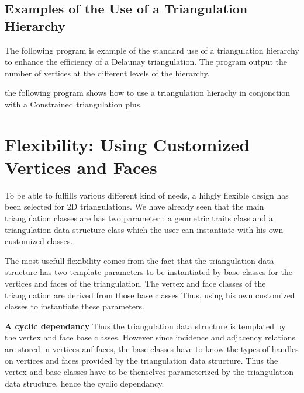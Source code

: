 \subsection{Examples of the Use of a  Triangulation Hierarchy}
\label{Subsection_2D_Triangulations_Basic_Example}

The following program is example
of the  standard use of a  triangulation hierarchy
to enhance the efficiency
of a Delaunay triangulation. The program output the number of vertices
at the different levels of the hierarchy.

the following program shows how to use
a triangulation hierachy in conjonction with a Constrained 
triangulation plus.

\section{Flexibility: Using  Customized Vertices and Faces}
\label{Section_2D_Triangulations_Flexibility}


To be able to fulfills various different kind of needs, a hihgly
flexible design has been  selected for 2D triangulations.
We have already seen that
the main triangulation classes are has two
parameter : a geometric traits class
and a triangulation data structure  class
which the user can instantiate with his own customized classes.

The most usefull flexibility  comes from the fact
that the triangulation data structure has two template
parameters to be instantiated by 
base classes for the vertices and faces of the triangulation.
The vertex and face classes of the triangulation are derived
from those base classes
Thus, using his own customized classes to instantiate these
parameters.

{\bf A cyclic dependancy}
Thus the triangulation data structure is templated by the
vertex and face base classes. However since incidence and adjacency
relations are stored in vertices anf faces, the base classes have to
know the types of handles on vertices and faces provided
by the triangulation data structure. Thus the vertex and base
classes have to be thenselves parameterized by the triangulation data
structure, hence the cyclic dependancy.


